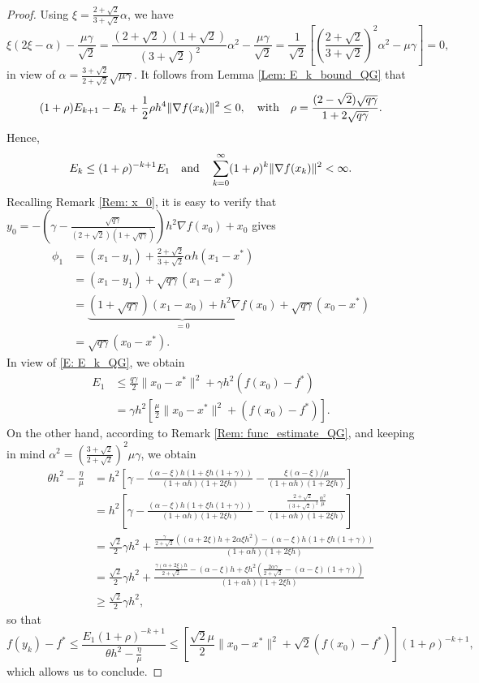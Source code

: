 \documentclass[pdflatex,sn-mathphys-num]{sn-jnl}
\theoremstyle{thmstyleone}
\theoremstyle{thmstyletwo}
\theoremstyle{thmstylethree}
\newcommand{\qbox}[1]{\quad\hbox{#1}\quad}
\begin{document}
\begin{proof}
Using $\xi = \frac{2+\sqrt{2}}{3+\sqrt{2}}\alpha$, we have
$$ \xi(2\xi-\alpha) - \frac{\mu\gamma}{\sqrt{2}} = \frac{(2+\sqrt{2})(1+\sqrt{2})}{(3+\sqrt{2})^2}\alpha^2 - \frac{\mu\gamma}{\sqrt{2}} = \frac{1}{\sqrt{2}}\left[ \left( \frac{2+\sqrt{2}}{3+\sqrt{2}} \right)^2 \alpha^2 - \mu\gamma \right] = 0, $$
in view of $\alpha=\frac{3+\sqrt{2}}{2+\sqrt{2}}\sqrt{\mu\gamma}$. It follows from Lemma \ref{Lem: E_k_bound_QG} that
$$ (1+\rho)E_{k+1} - E_k + \frac{1}{2}\rho h^4 \| \nabla f(x_k) \|^2 \le 0,\qbox{with} \rho = \frac{ (2-\sqrt{2})\sqrt{q\gamma} }{ 1 + 2\sqrt{q\gamma} }. $$
Hence,
$$ E_k \le (1+\rho)^{-k+1}E_1 \qbox{and} \sum_{k=0}^\infty (1+\rho)^k \| \nabla f(x_k) \|^2 < \infty. $$
Recalling Remark \ref{Rem: x_0}, it is easy to verify that $y_0 = -\left( \gamma - \frac{\sqrt{q\gamma}}{ (2+\sqrt{2})(1+\sqrt{q\gamma}) } \right)h^2\nabla f(x_0) + x_0$ gives 
\begin{align*}
\phi_1 
&= (x_1-y_1) + \frac{2+\sqrt{2}}{3+\sqrt{2}}\alpha h (x_1-x^*) \\
&= (x_1-y_1) + \sqrt{q\gamma}(x_1-x^*) \\
&= \underbrace{ ( 1 + \sqrt{q\gamma} ) (x_1-x_0) + h^2\nabla f(x_0) }_{=0} 
   + \sqrt{q\gamma} (x_0-x^*) \\
&= \sqrt{q\gamma} (x_0-x^*).
\end{align*}
In view of \eqref{E: E_k_QG}, we obtain
\begin{align*}
E_1
&\le \frac{q\gamma}{2} \| x_0 - x^* \|^2 + \gamma h^2 \left( f(x_0) - f^* \right) \\
&= \gamma h^2 \left[ \frac{\mu}{2} \| x_0 - x^* \|^2 + \left( f(x_0) - f^* \right)  \right]. 
\end{align*}
On the other hand, according to Remark \ref{Rem: func_estimate_QG}, and keeping in mind $\alpha^2 = \left( \frac{3+\sqrt{2}}{2+\sqrt{2}} \right)^2 \mu\gamma$, we obtain
\begin{align*}
\theta h^2 - \frac{\eta}{\mu}
&= h^2 \left[ \gamma - \frac{(\alpha-\xi)h \left( 1 + \xi h (1+\gamma) \right) }{(1+\alpha h)( 1+2\xi h )} - \frac{ \xi(\alpha-\xi)/\mu }{(1+\alpha h)(1+2\xi h)} \right] \\
&= h^2 \left[ \gamma - \frac{(\alpha-\xi)h \left( 1 + \xi h (1+\gamma) \right) }{(1+\alpha h)( 1+2\xi h )} - \frac{ \frac{ 2+\sqrt{2} }{(3+\sqrt{2})^2} \frac{\alpha^2}{\mu} }{(1+\alpha h)(1+2\xi h)} \right] \\
&= \frac{\sqrt{2}}{2}\gamma h^2 + \frac{ \frac{\gamma}{2+\sqrt{2}} \left( (\alpha+2\xi)h + 2\alpha\xi h^2 \right) - (\alpha-\xi)h \left( 1 + \xi h (1+\gamma) \right) }{(1+\alpha h)(1+2\xi h)}\\
&= \frac{\sqrt{2}}{2}\gamma h^2 + \frac{ \frac{\gamma (\alpha+2\xi)h}{2+\sqrt{2}} - (\alpha-\xi)h + \xi h^2 \left( \frac{2\alpha\gamma}{2+\sqrt{2}} - (\alpha-\xi)(1+\gamma)  \right) }{(1+\alpha h)(1+2\xi h)} \\
&\ge \frac{\sqrt{2}}{2}\gamma h^2, 
\end{align*}
so that
$$ f(y_k) - f^*  
\le \frac{E_1 (1+\rho)^{-k+1}}{\theta h^2 - \frac{\eta}{\mu} } 
\le \left[ \frac{\sqrt{2}\mu}{2} \| x_0 - x^* \|^2 + \sqrt{2}\left( f(x_0) - f^* \right)  \right] (1+\rho)^{-k+1}, $$
which allows us to conclude.
\end{proof}
\end{document}
